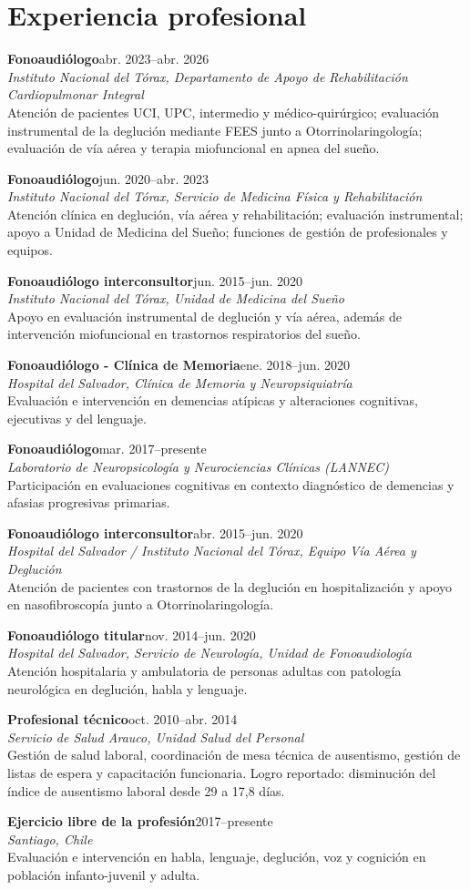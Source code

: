 \documentclass[10pt,a4paper]{article}
\newcommand{\entry}[4]{%
\textbf{#1}\hfill {\small #2}\\
{\emph{#3}}\\[-1pt]
#4\par\vspace{4pt}}
\begin{document}
\section*{Experiencia profesional}
\entry{Fonoaudiólogo}{abr. 2023--abr. 2026}{Instituto Nacional del Tórax, Departamento de Apoyo de Rehabilitación Cardiopulmonar Integral}{Atención de pacientes UCI, UPC, intermedio y médico-quirúrgico; evaluación instrumental de la deglución mediante FEES junto a Otorrinolaringología; evaluación de vía aérea y terapia miofuncional en apnea del sueño.}
\entry{Fonoaudiólogo}{jun. 2020--abr. 2023}{Instituto Nacional del Tórax, Servicio de Medicina Física y Rehabilitación}{Atención clínica en deglución, vía aérea y rehabilitación; evaluación instrumental; apoyo a Unidad de Medicina del Sueño; funciones de gestión de profesionales y equipos.}
\entry{Fonoaudiólogo interconsultor}{jun. 2015--jun. 2020}{Instituto Nacional del Tórax, Unidad de Medicina del Sueño}{Apoyo en evaluación instrumental de deglución y vía aérea, además de intervención miofuncional en trastornos respiratorios del sueño.}
\entry{Fonoaudiólogo - Clínica de Memoria}{ene. 2018--jun. 2020}{Hospital del Salvador, Clínica de Memoria y Neuropsiquiatría}{Evaluación e intervención en demencias atípicas y alteraciones cognitivas, ejecutivas y del lenguaje.}
\entry{Fonoaudiólogo}{mar. 2017--presente}{Laboratorio de Neuropsicología y Neurociencias Clínicas (LANNEC)}{Participación en evaluaciones cognitivas en contexto diagnóstico de demencias y afasias progresivas primarias.}
\entry{Fonoaudiólogo interconsultor}{abr. 2015--jun. 2020}{Hospital del Salvador / Instituto Nacional del Tórax, Equipo Vía Aérea y Deglución}{Atención de pacientes con trastornos de la deglución en hospitalización y apoyo en nasofibroscopía junto a Otorrinolaringología.}
\entry{Fonoaudiólogo titular}{nov. 2014--jun. 2020}{Hospital del Salvador, Servicio de Neurología, Unidad de Fonoaudiología}{Atención hospitalaria y ambulatoria de personas adultas con patología neurológica en deglución, habla y lenguaje.}
\entry{Profesional técnico}{oct. 2010--abr. 2014}{Servicio de Salud Arauco, Unidad Salud del Personal}{Gestión de salud laboral, coordinación de mesa técnica de ausentismo, gestión de listas de espera y capacitación funcionaria. Logro reportado: disminución del índice de ausentismo laboral desde 29 a 17,8 días.}
\entry{Ejercicio libre de la profesión}{2017--presente}{Santiago, Chile}{Evaluación e intervención en habla, lenguaje, deglución, voz y cognición en población infanto-juvenil y adulta.}
\end{document}
